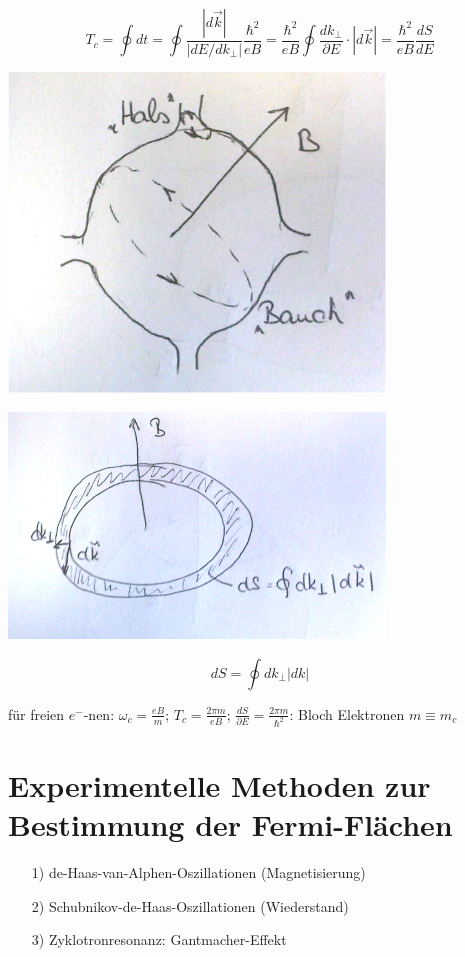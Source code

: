 \[T_c = \oint dt = \oint \frac{|d\vec k|}{|dE/dk_\bot|}\frac{\hbar^2}{eB} = \frac{\hbar^2}{eB}\oint \frac{dk_\bot}{\partial E}\cdot|d\vec k| = \frac{\hbar^2}{eB}\frac{dS}{dE}\]

\includegraphics[width=0.75\textwidth]{kap10_07.png}


\includegraphics[width=0.75\textwidth]{kap10_08.png}


\[dS = \oint dk_\bot |dk|\]

für freien \(e^-\)-nen: \(\omega_c = \frac{eB}{m}\); \(T_c = \frac{2\pi m}{eB}\); \(\frac{dS}{\partial E}= \frac{2\pi m}{\hbar^2}\): Bloch Elektronen \(\boxed{m\equiv m_c}\)

\section{Experimentelle Methoden zur Bestimmung der Fermi-Flächen}

\begin{enumerate}
\item[1)] de-Haas-van-Alphen-Oszillationen (Magnetisierung)
\item[2)] Schubnikov-de-Haas-Oszillationen (Wiederstand)
\item[3)] Zyklotronresonanz: Gantmacher-Effekt
\end{enumerate}
 
